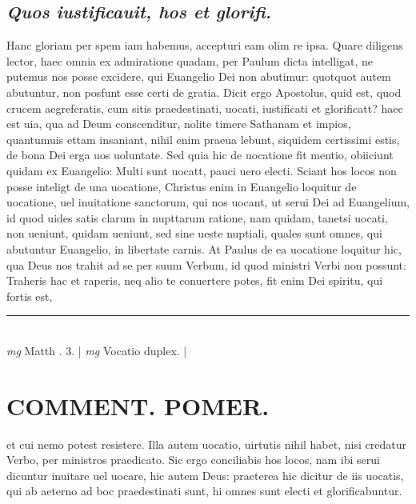 \documentclass{article}
\begin{document}
\begin{pages}
\subsection*{\textit{Quos iustificauit, hos et glorifi. }}\pstart Hanc gloriam per spem iam habemus, accepturi eam olim re ipsa. Quare diligens lector, haec omnia ex admiratione quadam, per Paulum dicta intelligat, ne putemus nos posse excidere, qui Euangelio Dei non abutimur: quotquot autem abutuntur, non posfunt esse certi de gratia. Dicit ergo Apostolus, quid est, quod crucem aegreferatis, cum sitis praedestinati, uocati, iustificati et glorificatt? haec est uia, qua ad Deum conscenditur, nolite timere Sathanam et impios, quantumuis ettam insaniant, nihil enim praeua lebunt, siquidem certissimi estis, de bona Dei erga uos uoluntate. Sed quia hic de uocatione fit mentio, obiiciunt quidam ex Euangelio: Multi sunt uocatt, pauci uero electi. Sciant hos locos non posse inteligt de una uocatione, Christus enim in Euangelio loquitur de uocatione, uel inuitatione sanctorum, qui nos uocant, ut serui Dei ad Euangelium, id quod uides satis clarum in nupttarum ratione, nam quidam, tanetsi uocati, non ueniunt, quidam ueniunt, sed sine ueste nuptiali, quales sunt omnes, qui abutuntur Euangelio, in libertate carnis. At Paulus de ea uocatione loquitur hic, qua Deus nos trahit ad se per suum Verbum, id quod ministri Verbi non possunt: Traheris hac et raperis, neq alio te conuertere potes, fit enim Dei spiritu, qui fortis est,  \pend
\vspace{0.5cm}\noindent
\vspace{0.2cm}\rule{1cm}{0.2pt}\\ 
\hspace{0.2cm}\textit{mg}
\footnotesize Matth . 3.  
\normalsize| 
\hspace{0.2cm}\textit{mg}
\footnotesize Vocatio duplex. 
\normalsize| 
\section*{COMMENT. POMER.  }\pstart et cui nemo potest resistere. Illa autem uocatio, uirtutis nihil habet, nisi credatur Verbo, per ministros praedicato. Sic ergo conciliabis hos locos, nam ibi serui dicuntur inuitare uel uocare, hic autem Deus: praeterea hic dicitur de iis uocatis, qui ab aeterno ad boc praedestinati sunt, hi omnes sunt electi et glorificabuntur.   \pend
{}
{}

\end{pages}
\end{document}
